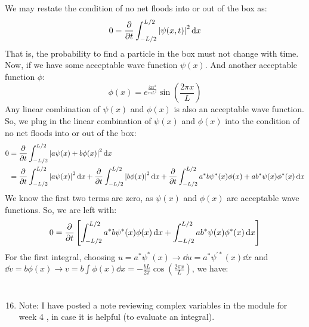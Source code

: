 \documentclass[12pt]{article}
\begin{document}
\subsection{}
We may restate the condition of no net floods into or out of the box as:
\begin{equation}
  0=\pdv{t}\int_{-L / 2}^{L / 2} \abs{\psi(x, t)}^{2} \dd{x}
\end{equation}
That is, the probability to find a particle in the box must not change with time.
Now, if we have some acceptable wave function $\psi(x)$.
And another acceptable function $\phi $:
\begin{equation}
  \phi (x)=e^{\frac{i2\pi^2}{mL^2}}\sin\left(\frac{2\pi x}{L}\right)
\end{equation}
Any linear combination of $\psi(x)$ and $\phi(x)$ is also an acceptable wave function.
So, we plug in the linear combination of $\psi(x)$ and $\phi(x)$ into the condition of no net floods into or out of the box:
\begin{equation}
  \begin{aligned}
    0&=\pdv{t}\int_{-L / 2}^{L / 2} \abs{a\psi(x)+b\phi(x)}^{2} \dd{x}\\
    &=\pdv{t}\int_{-L / 2}^{L / 2} \abs{a\psi(x)}^{2} \dd{x}+\pdv{t}\int_{-L / 2}^{L / 2} \abs{b\phi(x)}^{2} \dd{x}+\pdv{t}\int_{-L / 2}^{L / 2} a^*b\psi^*(x)\phi(x)+ab^*\psi(x)\phi^*(x) \dd{x}\\
\end{aligned}
\end{equation}
We know the first two terms are zero, as $\psi(x)$ and $\phi(x)$ are acceptable wave functions. So, we are left with:
\begin{equation}
  0=\pdv{t}\left[\int_{-L / 2}^{L / 2} a^*b\psi^*(x)\phi(x)\dd{x}+\int_{-L / 2}^{L / 2} ab^*\psi(x)\phi^*(x) \dd{x}\right]
\end{equation}
For the first integral, choosing $u = a^*\psi^*(x) \rightarrow \dd{u} = a^*\psi^{\prime *}(x) \dd{x}$ and $\dd{v} = b\phi(x) \rightarrow v = b\int \phi(x) \dd{x} = -\frac{bL}{2\pi}\cos\left(\frac{2\pi x}{L}\right)$, we have:
\section{}
\begin{enumerate}
  \setcounter{enumi}{15}
  \item Note: I have posted a note reviewing complex variables in the module for week 4 , in case it is helpful (to evaluate an integral).
\end{enumerate}
\end{document}

